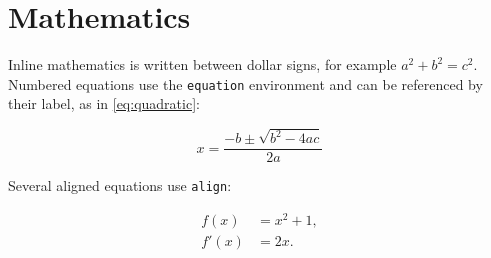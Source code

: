 \section{Mathematics}\label{sec:math}

Inline mathematics is written between dollar signs, for example
$a^2 + b^2 = c^2$. Numbered equations use the \texttt{equation} environment
and can be referenced by their label, as in \cref{eq:quadratic}:

\begin{equation}\label{eq:quadratic}
  x = \frac{-b \pm \sqrt{b^{2} - 4ac}}{2a}
\end{equation}

Several aligned equations use \texttt{align}:

\begin{align}
  f(x)  &= x^2 + 1, \label{eq:f} \\
  f'(x) &= 2x.      \label{eq:fprime}
\end{align}
